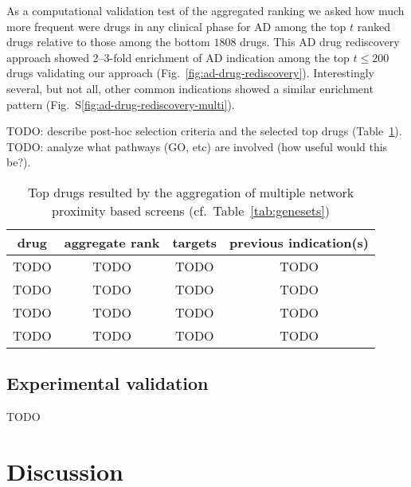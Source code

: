 \documentclass[letterpaper]{article}
\begin{document}
As a computational validation test of the aggregated ranking we asked how much
more frequent were drugs in any clinical phase for AD among the top $t$ ranked
drugs relative to those among the bottom $1808$ drugs.  This AD drug
rediscovery approach showed 2--3-fold enrichment of AD indication among the
top $t \le 200$ drugs validating our approach
(Fig.~\ref{fig:ad-drug-rediscovery}).  Interestingly several, but not all,
other common indications showed a similar enrichment pattern
(Fig.~S\ref{fig:ad-drug-rediscovery-multi}).

TODO: describe post-hoc selection criteria and the selected top drugs
(Table~\ref{tab:top-drugs}).  TODO: analyze what pathways (GO, etc) are
involved (how useful would this be?).

\begin{table}
\footnotesize
\begin{tabular}{cccc}
drug     & aggregate rank & targets & previous indication(s)  \\
\hline
TODO & TODO & TODO & TODO \\
TODO & TODO & TODO & TODO \\
TODO & TODO & TODO & TODO \\
TODO & TODO & TODO & TODO \\
\end{tabular}
\caption{
Top drugs resulted by the aggregation of multiple network proximity based
screens (cf.~Table~\ref{tab:genesets})
}
\label{tab:top-drugs}
\end{table}

\subsection{Experimental validation}

TODO

\section{Discussion}
\end{document}
